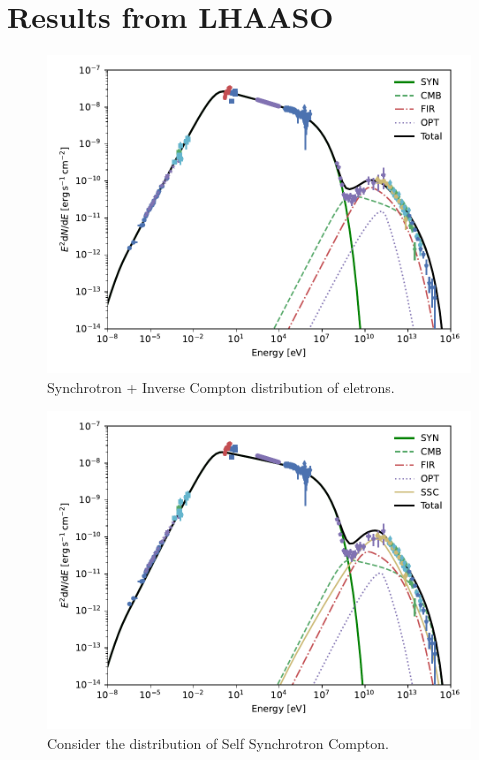 \documentclass[9pt, mathserif]{beamer}
\begin{document}
    \section{Results from LHAASO}
        \begin{frame}
            \begin{figure}[t]
                \centering
                \includegraphics[width=0.8\linewidth]{SynIC-BestFitPar1.pdf}
                \caption{Synchrotron + Inverse Compton distribution of eletrons.}
            \end{figure}
        \end{frame}
        \begin{frame}
            \begin{figure}[t]
                \centering
                \includegraphics[width=0.8\linewidth]{SynIC-BestFitPar2.pdf}
                \caption{Consider the distribution of Self Synchrotron Compton.}
            \end{figure}
        \end{frame}
\end{document}
